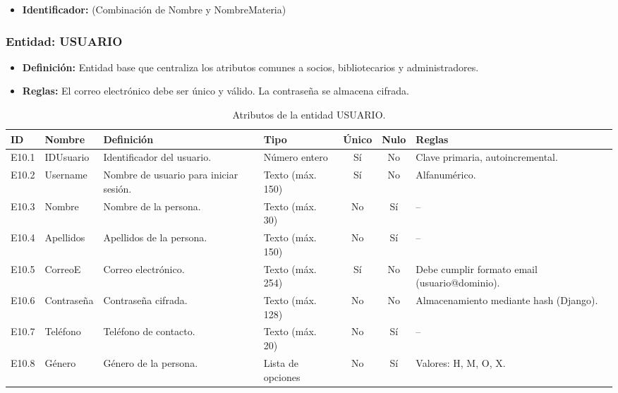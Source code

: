 	\begin{itemize}
		\item\textbf{Identificador:} (Combinación de Nombre y NombreMateria)
	\end{itemize}
	
	\subsubsection{Entidad: USUARIO}
	\begin{itemize}
		\item\textbf{Definición:} Entidad base que centraliza los atributos comunes a socios, bibliotecarios y administradores.
		\item\textbf{Reglas:} El correo electrónico debe ser único y válido. La contraseña se almacena cifrada.
	\end{itemize}
	
	\begin{table}[H]
		\centering
		\caption{Atributos de la entidad USUARIO.}
		\label{tab:dict_usuario}
		\small
		\begin{tabularx}{\textwidth}{l l X l c c X}
			\toprule
			\textbf{ID} & \textbf{Nombre} & \textbf{Definición} & \textbf{Tipo} & \textbf{Único} & \textbf{Nulo} & \textbf{Reglas} \\
			\midrule
			E10.1 & IDUsuario & Identificador del usuario. & Número entero & Sí & No & Clave primaria, autoincremental. \\
			\addlinespace
			E10.2 & Username & Nombre de usuario para iniciar sesión. & Texto (máx. 150) & Sí & No & Alfanumérico. \\
			\addlinespace
			E10.3 & Nombre & Nombre de la persona. & Texto (máx. 30) & No & Sí & -- \\
			\addlinespace
			E10.4 & Apellidos & Apellidos de la persona. & Texto (máx. 150) & No & Sí & -- \\
			\addlinespace
			E10.5 & CorreoE & Correo electrónico. & Texto (máx. 254) & Sí & No & Debe cumplir formato email (usuario@dominio). \\
			\addlinespace
			E10.6 & Contraseña & Contraseña cifrada. & Texto (máx. 128) & No & No & Almacenamiento mediante hash (Django). \\
			\addlinespace
			E10.7 & Teléfono & Teléfono de contacto. & Texto (máx. 20) & No & Sí & -- \\
			\addlinespace
			E10.8 & Género & Género de la persona. & Lista de opciones & No & Sí & Valores: H, M, O, X. \\
			\bottomrule
		\end{tabularx}
	\end{table}
	
